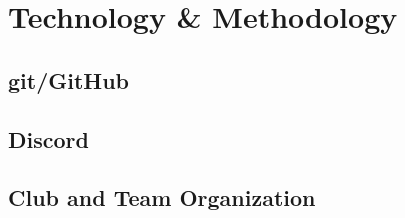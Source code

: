 \chapter{Technology \& Methodology}
\section{git/GitHub}
\section{Discord}
\section{Club and Team Organization}
